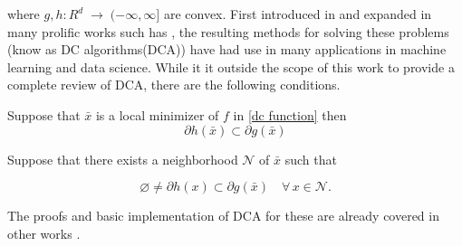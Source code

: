 \noindent where $g,h : R^d \;\rightarrow\; (-\infty,\infty] $ are convex. First introduced in \cite{tao_algorithms_1986} and expanded in many prolific works such has \cite{tao_convex_1997}, the resulting methods for solving these problems (know as DC algorithms(DCA)) have had use in many applications in machine learning and data science. While it it outside the scope of this work to provide a complete review of DCA, there are the following conditions. 
\begin{theorem}
 Suppose that $\bar{x}$ is a local minimizer of $f$ in \ref{dc function} then 
 \begin{equation}
 \partial h(\bar{x}) \subset \partial g(\bar{x})
\end{equation}

\label{thm:Necessary1}
\end{theorem}
\begin{theorem}
 Suppose that there exists a neighborhood $\mathcal{N}$ of $\bar{x}$ such that 

\begin{equation}
    \varnothing \neq \partial h(x) \subset \partial g(\bar{x})
\quad\forall\,x\in \mathcal{N}.
\label{eq:suff1}
\end{equation}

\label{thm:Necessary1}
\end{theorem}




\noindent The proofs and basic implementation of DCA for these are already covered in other works \cite{tao_convex_1997}. 

